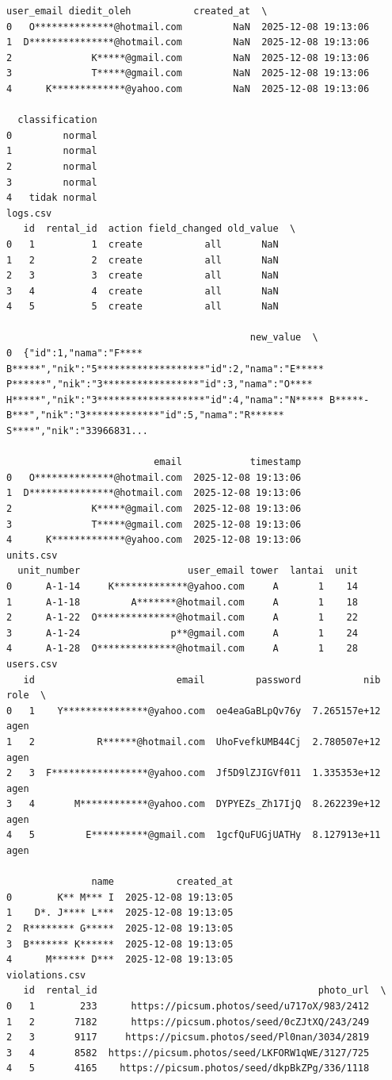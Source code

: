 \begin{lstlisting}[caption={Output 11}]
                     user_email diedit_oleh           created_at  \
0   O**************@hotmail.com         NaN  2025-12-08 19:13:06   
1  D***************@hotmail.com         NaN  2025-12-08 19:13:06   
2              K*****@gmail.com         NaN  2025-12-08 19:13:06   
3              T*****@gmail.com         NaN  2025-12-08 19:13:06   
4      K*************@yahoo.com         NaN  2025-12-08 19:13:06   

  classification  
0         normal  
1         normal  
2         normal  
3         normal  
4   tidak normal  
logs.csv
   id  rental_id  action field_changed old_value  \
0   1          1  create           all       NaN   
1   2          2  create           all       NaN   
2   3          3  create           all       NaN   
3   4          4  create           all       NaN   
4   5          5  create           all       NaN   

                                           new_value  \
0  {"id":1,"nama":"F**** B*****","nik":"5*******************"id":2,"nama":"E***** P******","nik":"3*****************"id":3,"nama":"O**** H*****","nik":"3*******************"id":4,"nama":"N***** B*****-B***","nik":"3*************"id":5,"nama":"R****** S****","nik":"33966831...   

                          email            timestamp  
0   O**************@hotmail.com  2025-12-08 19:13:06  
1  D***************@hotmail.com  2025-12-08 19:13:06  
2              K*****@gmail.com  2025-12-08 19:13:06  
3              T*****@gmail.com  2025-12-08 19:13:06  
4      K*************@yahoo.com  2025-12-08 19:13:06  
units.csv
  unit_number                   user_email tower  lantai  unit
0      A-1-14     K*************@yahoo.com     A       1    14
1      A-1-18         A*******@hotmail.com     A       1    18
2      A-1-22  O**************@hotmail.com     A       1    22
3      A-1-24                p**@gmail.com     A       1    24
4      A-1-28  O**************@hotmail.com     A       1    28
users.csv
   id                         email         password           nib  role  \
0   1    Y***************@yahoo.com  oe4eaGaBLpQv76y  7.265157e+12  agen   
1   2           R******@hotmail.com  UhoFvefkUMB44Cj  2.780507e+12  agen   
2   3  F*****************@yahoo.com  Jf5D9lZJIGVf011  1.335353e+12  agen   
3   4       M************@yahoo.com  DYPYEZs_Zh17IjQ  8.262239e+12  agen   
4   5         E**********@gmail.com  1gcfQuFUGjUATHy  8.127913e+11  agen   

               name           created_at  
0        K** M*** I  2025-12-08 19:13:05  
1    D*. J**** L***  2025-12-08 19:13:05  
2  R******** G*****  2025-12-08 19:13:05  
3  B******* K******  2025-12-08 19:13:05  
4      M****** D***  2025-12-08 19:13:05  
violations.csv
   id  rental_id                                       photo_url  \
0   1        233      https://picsum.photos/seed/u717oX/983/2412   
1   2       7182      https://picsum.photos/seed/0cZJtXQ/243/249   
2   3       9117     https://picsum.photos/seed/Pl0nan/3034/2819   
3   4       8582  https://picsum.photos/seed/LKFORW1qWE/3127/725   
4   5       4165    https://picsum.photos/seed/dkpBkZPg/336/1118   


\end{lstlisting}
